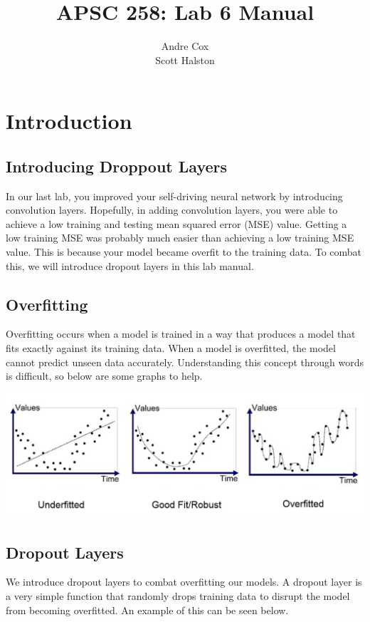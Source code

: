 \documentclass[11pt]{report}
\title{APSC 258: Lab 6 Manual}
\author{Andre Cox  \\ Scott Halston}
\begin{document}
\maketitle
\tableofcontents

\clearpage

\chapter{Introduction}
\section{Introducing Droppout Layers}
In our last lab, you improved your self-driving neural network by introducing convolution layers. Hopefully, in adding convolution layers, you were able to achieve a low training and testing mean squared error (MSE) value. Getting a low training MSE was probably much easier than achieving a low training MSE value. This is because your model became overfit to the training data. To combat this, we will introduce dropout layers in this lab manual.

\section{Overfitting}
Overfitting occurs when a model is trained in a way that produces a model that fits exactly against its training data. When a model is overfitted, the model cannot predict unseen data accurately. Understanding this concept through words is difficult, so below are some graphs to help.

\begin{center}
    \includegraphics[scale=0.375]{./images/overfitexample.png}
\end{center}

\section{Dropout Layers}
We introduce dropout layers to combat overfitting our models. A dropout layer is a very simple function that randomly drops training data to disrupt the model from becoming overfitted. An example of this can be seen below.
\end{document}
